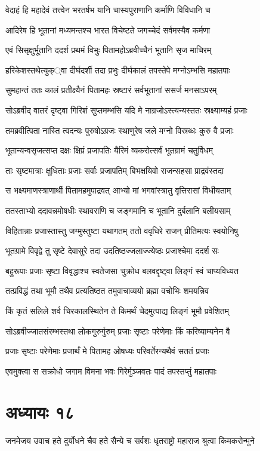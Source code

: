 \twolineshloka
{वेदाहं हि महादेवं तत्त्वेन भरतर्षभ}
{यानि चास्यपुराणानि कर्माणि विविधानि च}


\twolineshloka
{आदिरेष हि भूतानां मध्यमन्तश्च भारत}
{विचेष्टते जगच्चेदं सर्वमस्यैव कर्मणा}


\twolineshloka
{एवं सिसृक्षुर्भूतानि ददर्श प्रथमं विभुः}
{पितामहोऽब्रवीच्चैनं भूतानि सृज माचिरम्}


\twolineshloka
{हरिकेशस्तथेत्युक््वा दीर्घदर्शी तदा प्रभुः}
{दीर्घकालं तपस्तेपे मग्नोऽम्भसि महातपाः}


\twolineshloka
{सुमहान्तं ततः कालं प्रतीक्ष्यैनं पितामहः}
{स्रष्टारं सर्वभूतानां ससर्ज मनसाऽपरम्}


\twolineshloka
{सोऽब्रवीद् वातरं दृष्ट्वा गिरिशं सुप्तमम्भसि}
{यदि मे नाग्रजोऽस्त्यन्यस्ततः स्रक्ष्याम्यहं प्रजाः}


\twolineshloka
{तमब्रवीत्पिता नास्ति त्वदन्यः पुरुषोऽग्रजः}
{स्थाणुरेष जले मग्नो विस्रब्धः कुरु वै प्रजाः}


\twolineshloka
{भूतान्यन्वसृजत्सप्त दक्षः क्षिप्रं प्रजापतिः}
{यैरिमं व्यकरोत्सर्वं भूतग्रामं चतुर्विधम्}


\twolineshloka
{ताः सृष्टमात्राः क्षुधिताः प्रजाः सर्वाः प्रजापतिम्}
{बिभक्षयिवो राजन्सहसा प्राद्रवंस्तदा}


\twolineshloka
{स भक्ष्यमाणस्त्राणार्थी पितामहमुपाद्रवत्}
{आभ्यो मां भगवांस्त्रातु वृत्तिरासां विधीयताम्}


\twolineshloka
{ततस्ताभ्यो ददावन्नमोषधीः स्थावराणि च}
{जङ्गमानि च भूतानि दुर्बलानि बलीयसाम्}


\twolineshloka
{विहितान्नाः प्रजास्तास्तु जग्मुस्तुष्टा यथागतम्}
{ततो ववृधिरे राजन् प्रीतिमत्यः स्वयोनिषु}


\twolineshloka
{भूतग्रामे विवृद्वे तु सृष्टे देवासुरे तदा}
{उदतिष्ठज्जलाज्ज्येष्ठः प्रजाश्चेमा ददर्श सः}


\twolineshloka
{बहुरूपाः प्रजाः सृष्टा विवृद्धाश्च स्वतेजसा}
{चुक्रोध बलवद्दृष्ट्वा लिङ्गं स्वं चाप्यविध्यत}


\twolineshloka
{तत्प्रविद्धं तथा भूमौ तथैव प्रत्यतिष्ठत}
{तमुवाचाव्ययो ब्रह्मा वचोभिः शमयन्निव}


\twolineshloka
{किं कृतं सलिले शर्व चिरकालस्थितेन ते}
{किमर्थं चेदमुत्पाद्य लिङ्गं भूमौ प्रवेशितम्}


\twolineshloka
{सोऽब्रवीज्जातसंरम्भस्तथा लोकगुरुर्गुरुम्}
{प्रजाः सृष्टाः परेणेमाः किं करिष्याम्यनेन वै}


\twolineshloka
{प्रजाः सृष्टाः परेणेमाः प्रजार्थं मे पितामह}
{ओषध्यः परिवर्तेरन्यथैवं सततं प्रजाः}


\twolineshloka
{एवमुक्त्वा स सक्रोधो जगाम विमना भवः}
{गिरेर्मुञ्जवतः पादं तपस्तप्तुं महातपाः}


\chapter{अध्यायः १८}
\threelineshloka
{जनमेजय उवाच}
{हते दुर्योधने चैव हते सैन्ये च सर्वशः}
{धृतराष्ट्रो महाराज श्रुत्वा किमकरोन्मुने}


